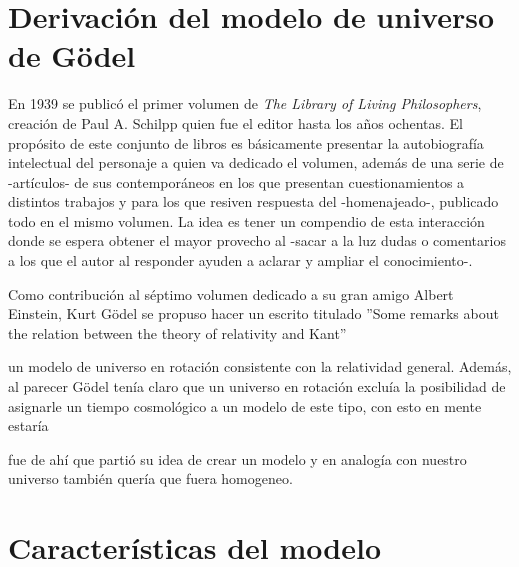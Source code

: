 \documentclass[11pt]{book}
\begin{document}
\section{Derivación del modelo de universo de Gödel}



En 1939 se publicó el primer volumen de \emph{The Library of Living Philosophers}, creación de Paul A. Schilpp quien fue el editor hasta los años  ochentas. El propósito de este conjunto de libros es básicamente presentar la autobiografía intelectual del personaje a quien va dedicado el volumen, además de una serie de -artículos- de sus contemporáneos en los que presentan cuestionamientos a distintos trabajos y para los que resiven respuesta del -homenajeado-, publicado todo en el mismo volumen. La idea es tener un compendio de esta interacción donde se espera obtener el mayor provecho al -sacar a la luz dudas o comentarios a los que el autor al responder ayuden a aclarar y ampliar el conocimiento-.

Como contribución al séptimo volumen dedicado a su gran amigo Albert Einstein, Kurt Gödel se propuso hacer un escrito titulado ''Some remarks about the relation between the theory of relativity and Kant''

un modelo de universo en rotación consistente con la relatividad general.
Además, al parecer Gödel tenía claro que un universo en rotación excluía la posibilidad de asignarle un tiempo cosmológico a un modelo de este tipo, con esto en mente estaría 

 fue de ahí que partió su idea de crear un modelo y en analogía con nuestro universo también quería que fuera homogeneo.



\section{Características del modelo}
\end{document}
